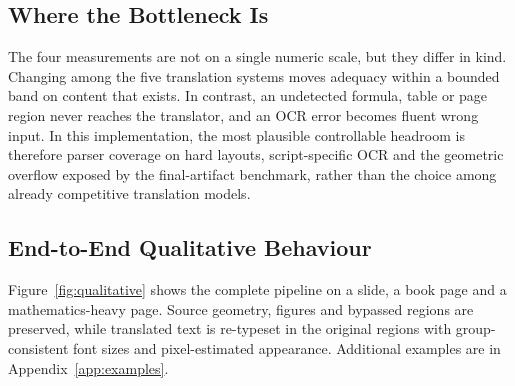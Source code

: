 \subsection{Where the Bottleneck Is}
\label{subsec:res-bottleneck}

The four measurements are not on a single numeric scale, but they differ in kind.
Changing among the five translation systems moves adequacy within a bounded band
on content that exists. In contrast, an undetected formula, table or page region
never reaches the translator, and an OCR error becomes fluent wrong input. In
this implementation, the most plausible controllable headroom is therefore
parser coverage on hard layouts, script-specific OCR and the geometric overflow
exposed by the final-artifact benchmark, rather than the choice among already
competitive translation models.

\subsection{End-to-End Qualitative Behaviour}

Figure~\ref{fig:qualitative} shows the complete pipeline on a slide, a book page
and a mathematics-heavy page. Source geometry, figures and bypassed regions are
preserved, while translated text is re-typeset in the original regions with
group-consistent font sizes and pixel-estimated appearance. Additional examples
are in Appendix~\ref{app:examples}.

